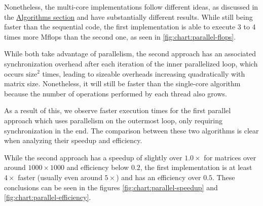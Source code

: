 Nonetheless, the multi-core implementations follow different ideas, as discussed in the \hyperref[section:algorithms]{Algorithms section} and have substantially different results. While still being faster than the sequential code, the first implementation is able to execute 3 to 4 times more Mflops than the second one, as seen in \ref{fig:chart:parallel-flops}.

While both take advantage of parallelism, the second approach has an associated synchronization overhead after each iteration of the inner parallelized loop, which occurs $\text{size}^2$ times, leading to sizeable overheads increasing quadratically with matrix size. Nonetheless, it will still be faster than the single-core algorithm because the number of operations performed by each thread also grows.

As a result of this, we observe faster execution times for the first parallel approach which uses parallelism on the outermost loop, only requiring synchronization in the end. The comparison between these two algorithms is clear when analyzing their speedup and efficiency. 

While the second approach has a speedup of slightly over $1.0\times$ for matrices over around $1000 \times 1000$ and efficiency below $0.2$, the first implementation is at least $4\times$ faster (usually even around $5\times$) and has an efficiency over $0.5$. These conclusions can be seen in the figures \ref{fig:chart:parallel-speedup} and \ref{fig:chart:parallel-efficiency}.


